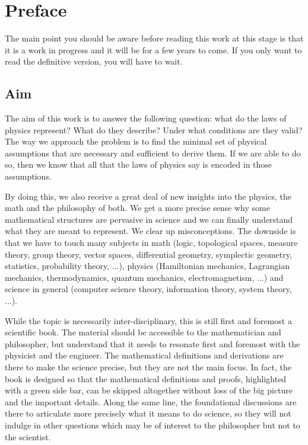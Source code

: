 \documentclass[11pt,letterpaper,fleqn]{memoir} %
\begin{document}
\chapter{Preface}

The main point you should be aware before reading this work at this stage is that it is a work in progress and it will be for a few years to come. If you only want to read the definitive version, you will have to wait.

\section*{Aim}

The aim of this work is to answer the following question: what do the laws of physics represent? What do they describe? Under what conditions are they valid? The way we approach the problem is to find the minimal set of physical assumptions that are necessary and sufficient to derive them. If we are able to do so, then we know that all that the laws of physics say is encoded in those assumptions.

By doing this, we also receive a great deal of new insights into the physics, the math and the philosophy of both. We get a more precise sense why some mathematical structures are pervasive in science and we can finally understand what they are meant to represent. We clear up misconceptions. The downside is that we have to touch many subjects in math (logic, topological spaces, measure theory, group theory, vector spaces, differential geometry, symplectic geometry, statistics, probability theory, ...), physics (Hamiltonian mechanics, Lagrangian mechanics, thermodynamics, quantum mechanics, electromagnetism, ...) and science in general (computer science theory, information theory, system theory, ...).

While the topic is necessarily inter-disciplinary, this is still first and foremost a scientific book. The material should be accessible to the mathematician and philosopher, but understand that it needs to resonate first and foremost with the physicist and the engineer. The mathematical definitions and derivations are there to make the science precise, but they are not the main focus. In fact, the book is designed so that the mathematical definitions and proofs, highlighted with a green side bar, can be skipped altogether without loss of the big picture and the important details. Along the same line, the foundational discussions are there to articulate more precisely what it means to do science, so they will not indulge in other questions which may be of interest to the philosopher but not to the scientist.
\end{document}
